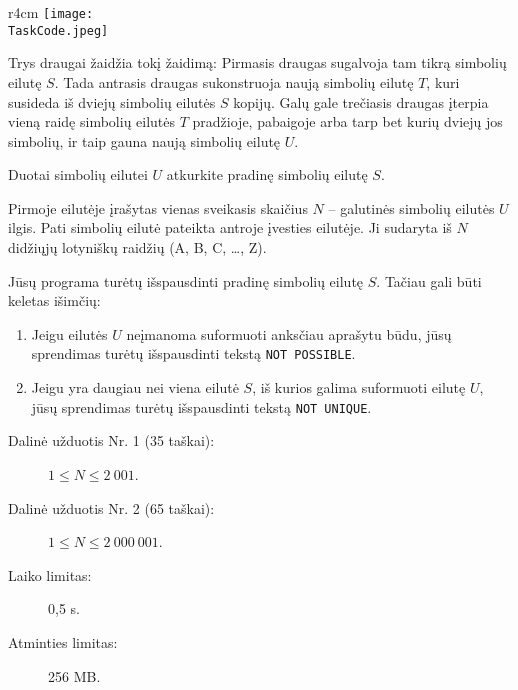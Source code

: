 \documentclass{boi2014-lt}
\renewcommand{\TaskCode}{friends}
\begin{document}
    \begin{wrapfigure}{r}{4cm}
        \vspace{-24pt}
		\texttt{[image: \\TaskCode.jpeg]}
	\end{wrapfigure}
	Trys draugai žaidžia tokį žaidimą:
	Pirmasis draugas sugalvoja tam tikrą simbolių eilutę $S$.
	Tada antrasis draugas sukonstruoja naują simbolių eilutę $T$, kuri susideda
	iš dviejų simbolių eilutės $S$ kopijų.
	Galų gale trečiasis draugas įterpia vieną raidę simbolių eilutės $T$
	pradžioje, pabaigoje arba tarp bet kurių dviejų jos simbolių, ir taip gauna
	naują simbolių eilutę $U$.

    \Task
    Duotai simbolių eilutei $U$ atkurkite pradinę simbolių eilutę $S$.

    \Input
    Pirmoje eilutėje įrašytas vienas sveikasis skaičius $N$ -- galutinės simbolių
    eilutės $U$ ilgis. Pati simbolių eilutė pateikta antroje įvesties eilutėje.
    Ji sudaryta iš $N$ didžiųjų lotyniškų raidžių (A, B, C, \ldots, Z).

    \Output
    Jūsų programa turėtų išspausdinti pradinę simbolių eilutę $S$.
    Tačiau gali būti keletas išimčių:
    \begin{enumerate}
        \item Jeigu eilutės $U$ neįmanoma suformuoti anksčiau aprašytu būdu,
        jūsų sprendimas turėtų išspausdinti tekstą {\tt NOT POSSIBLE}.
        \item Jeigu yra daugiau nei viena eilutė $S$, iš kurios galima
        suformuoti eilutę $U$, jūsų sprendimas turėtų išspausdinti tekstą
        {\tt NOT UNIQUE}.
    \end{enumerate}
    

    \Examples


    \Scoring

    \begin{description}
        \item[Dalinė užduotis Nr. 1 (35 taškai):] $1 \le N \le 2~001$.
        \item[Dalinė užduotis Nr. 2 (65 taškai):] $1 \le N \le 2~000~001$.
    \end{description}

    \Constraints

    \begin{description}
        \item[Laiko limitas:] 0,5 s.
        \item[Atminties limitas:] 256 MB.
    \end{description}
\end{document}
